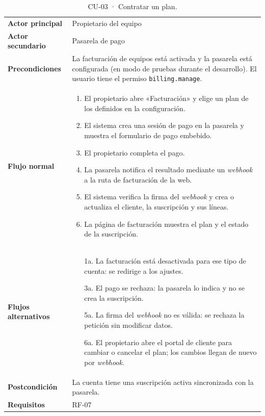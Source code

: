 {\footnotesize
\begin{xltabular}{\textwidth}{@{}>{\bfseries}p{2.6cm}X@{}}
  \caption{CU-03 · Contratar un plan.}\label{tab:ana-cu03}\\
    \toprule
    Actor principal & Propietario del equipo \\
    Actor secundario & Pasarela de pago \\
    Precondiciones & La facturación de equipos está activada y la pasarela está configurada (en modo de pruebas durante el desarrollo). El usuario tiene el permiso \texttt{billing.manage}. \\
    \midrule
    Flujo normal &
      \begin{enumerate}[nosep,leftmargin=*]
        \item El propietario abre «Facturación» y elige un plan de los definidos en la configuración.
        \item El sistema crea una sesión de pago en la pasarela y muestra el formulario de pago embebido.
        \item El propietario completa el pago.
        \item La pasarela notifica el resultado mediante un \textit{webhook} a la ruta de facturación de la web.
        \item El sistema verifica la firma del \textit{webhook} y crea o actualiza el cliente, la suscripción y sus líneas.
        \item La página de facturación muestra el plan y el estado de la suscripción.
      \end{enumerate} \\
    \midrule
    Flujos alternativos &
      \begin{itemize}[nosep,leftmargin=*]
        \item[1a.] La facturación está desactivada para ese tipo de cuenta: se redirige a los ajustes.
        \item[3a.] El pago se rechaza: la pasarela lo indica y no se crea la suscripción.
        \item[5a.] La firma del \textit{webhook} no es válida: se rechaza la petición sin modificar datos.
        \item[6a.] El propietario abre el portal de cliente para cambiar o cancelar el plan; los cambios llegan de nuevo por \textit{webhook}.
      \end{itemize} \\
    \midrule
    Postcondición & La cuenta tiene una suscripción activa sincronizada con la pasarela. \\
    Requisitos & RF-07 \\
    \bottomrule
\end{xltabular}}

